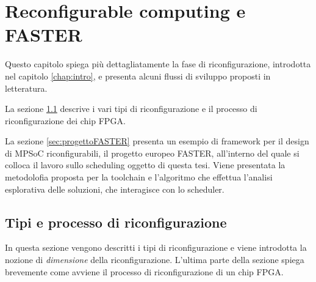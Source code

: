 \chapter{Reconfigurable computing e \acs{FASTER}}
\label{chap:recComputingFASTER}
\vspace{1cm}
Questo capitolo spiega pi\`u dettagliatamente la fase di riconfigurazione,
introdotta nel capitolo \ref{chap:intro}, e presenta alcuni flussi di sviluppo
proposti in letteratura.

La sezione \ref{sec:recComputingDettagli} descrive i vari tipi di riconfigurazione
e il processo di riconfigurazione dei chip \ac{FPGA}.

La sezione \ref{sec:progettoFASTER} presenta un esempio di framework per il design
di \ac{MPSoC} riconfigurabili, il progetto europeo \acs{FASTER}, all'interno del
quale si colloca il lavoro sullo scheduling oggetto di questa tesi. Viene presentata
la metodolofia proposta per la toolchain e l'algoritmo che effettua l'analisi esplorativa
delle soluzioni, che interagisce con lo scheduler.

\newpage

\section{Tipi e processo di riconfigurazione}
\label{sec:recComputingDettagli}
In questa sezione vengono descritti i tipi di riconfigurazione e viene introdotta
la nozione di \emph{dimensione} della riconfigurazione. L'ultima parte della sezione
spiega brevemente come avviene il processo di riconfigurazione di un chip \ac{FPGA}.

